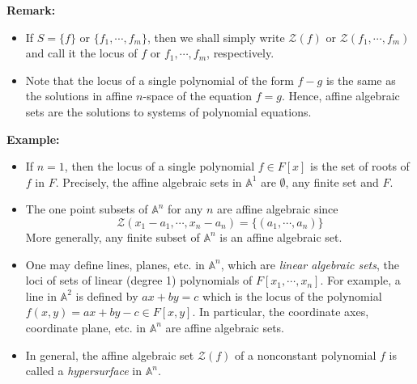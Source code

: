 \noindent\textbf{Remark:} \begin{itemize}
    \item If $S= \{f\}$ or $\{f_1 ,\cdots, f_m\}$, then we shall simply write $\mathcal{Z}(f)$ or $\mathcal{Z}(f_1 ,\cdots, f_m)$ and call it the locus of $f$ or $f_1 ,\cdots, f_m$, respectively.

    \item Note that the locus of a single polynomial of the form $f-g$ is the same as the solutions in affine $n$-space of the equation $f=g$. Hence, affine algebraic sets are the solutions to systems of polynomial equations.
\end{itemize}

\noindent\textbf{Example:} \begin{itemize}
    \item If $n=1$, then the locus of a single polynomial $f\in F[x]$ is the set of roots of $f$ in $F$. Precisely, the affine algebraic sets in $\mathbb{A}^1$ are $\emptyset$, any finite set and $F$.

    \item The one point subsets of $\mathbb{A}^n$ for any $n$ are affine algebraic since
    $$\mathcal{Z} (x_1 -a_1 ,\cdots, x_n- a_n) = \{ (a_1 ,\cdots, a_n)\}$$
    More generally, any finite subset of $\mathbb{A}^n$ is an affine algebraic set.

    \item One may define lines, planes, etc. in $\mathbb{A}^n$, which are \textit{linear algebraic sets}, the loci of sets of linear (degree 1) polynomials of $F[x_1 ,\cdots, x_n]$. For example, a line in $\mathbb{A}^2$ is defined by $ax+by=c$ which is the locus of the polynomial $f(x,y) =ax+by-c \in F[x,y]$. In particular, the coordinate axes, coordinate plane, etc. in $\mathbb{A}^n$ are affine algebraic sets.

    \item In general, the affine algebraic set $\mathcal{Z}(f)$ of a nonconstant polynomial $f$ is called a \textit{hypersurface} in $\mathbb{A}^n$.
\end{itemize}

